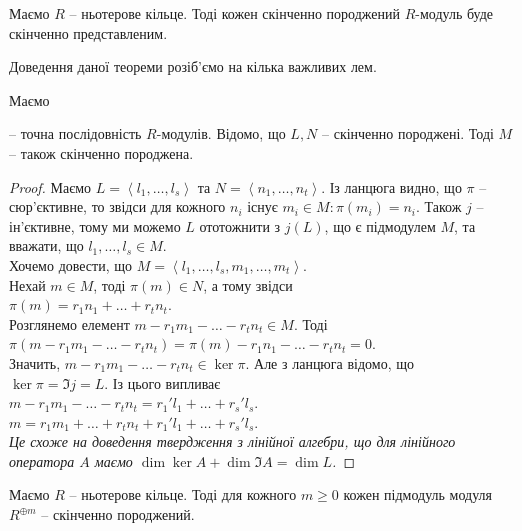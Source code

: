\documentclass{math_library}
\begin{document}
\begin{theorem}
Маємо $R$ -- ньотерове кільце. Тоді кожен скінченно породжений $R$-модуль буде скінченно представленим.
\end{theorem}

Доведення даної теореми розіб'ємо на кілька важливих лем.

\begin{lemma}
Маємо  -- точна послідовність $R$-модулів. Відомо, що $L,N$ -- скінченно породжені. Тоді $M$ -- також скінченно породжена.
\end{lemma}

\begin{proof}
Маємо $L = \left< l_1,\dots,l_s \right>$ та $N = \left< n_1,\dots,n_t\right>$. Із ланцюга видно, що $\pi$ -- сюр'єктивне, то звідси для кожного $n_i$ існує $m_i \in M: \pi(m_i) = n_i$. Також $j$ -- ін'єктивне, тому ми можемо $L$ ототожнити з $j(L)$, що є підмодулем $M$, та вважати, що $l_1,\dots,l_s \in M$.\\ Хочемо довести, що $M = \left< l_1,\dots,l_s,m_1,\dots,m_t \right>$.\\
Нехай $m \in M$, тоді $\pi(m) \in N$, а тому звідси\\
$\pi(m) = r_1 n_1 + \dots + r_t n_t$.\\
Розглянемо елемент $m - r_1m_1 - \dots - r_t n_t \in M$. Тоді\\
$\pi(m - r_1m_1 - \dots - r_t n_t ) = \pi(m) - r_1 n_1 - \dots - r_t n_t = 0$.\\
Значить, $m - r_1m_1 - \dots - r_t n_t \in \ker \pi$. Але з ланцюга відомо, що $\ker \pi = \Im j = L$. Із цього випливає\\
$m - r_1m_1 - \dots - r_t n_t = r_1'l_1 + \dots + r_s' l_s$.\\
$m =  r_1m_1 + \dots + r_t n_t + r_1'l_1 + \dots + r_s' l_s$.\\
\textit{Це схоже на доведення твердження з лінійної алгебри, що для лінійного оператора $A$ маємо $\dim \ker A + \dim \Im A = \dim L$.}
\end{proof}

\begin{lemma}
Маємо $R$ -- ньотерове кільце. Тоді для кожного $m \geq 0$ кожен підмодуль модуля $R^{\oplus m}$ -- скінченно породжений.
\end{lemma}
\end{document}
